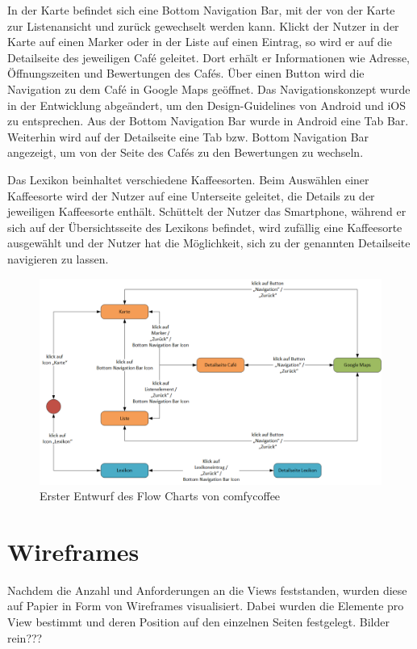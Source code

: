 In der Karte befindet sich eine Bottom Navigation Bar, mit der von der Karte zur Listenansicht und zurück gewechselt werden kann. Klickt der Nutzer in der Karte auf einen Marker oder in der Liste auf einen Eintrag, so wird er auf die Detailseite des jeweiligen Café geleitet. Dort erhält er Informationen wie Adresse, Öffnungszeiten und Bewertungen des Cafés. Über einen Button wird die Navigation zu dem Café in Google Maps geöffnet. Das Navigationskonzept wurde in der Entwicklung abgeändert, um den Design-Guidelines von Android und iOS zu entsprechen. Aus der Bottom Navigation Bar wurde in Android eine Tab Bar. Weiterhin wird auf der Detailseite eine Tab bzw. Bottom Navigation Bar angezeigt, um von der Seite des Cafés zu den Bewertungen zu wechseln.

Das Lexikon beinhaltet verschiedene Kaffeesorten. Beim Auswählen einer Kaffeesorte wird der Nutzer auf eine Unterseite geleitet, die Details zu der jeweiligen Kaffeesorte enthält. Schüttelt der Nutzer das Smartphone, während er sich auf der Übersichtsseite des Lexikons befindet, wird zufällig eine Kaffeesorte ausgewählt und der Nutzer hat die Möglichkeit, sich zu der genannten Detailseite navigieren zu lassen.

\begin{figure}[h!]
    \centering
		\includegraphics[width=\textwidth]{Bilder/flowchart.png}
		\caption{Erster Entwurf des Flow Charts von comfycoffee}
\end{figure}

\section{Wireframes}
Nachdem die Anzahl und Anforderungen an die Views feststanden, wurden diese auf Papier in Form von Wireframes visualisiert. Dabei wurden die Elemente pro View bestimmt und deren Position auf den einzelnen Seiten festgelegt.
Bilder rein???

